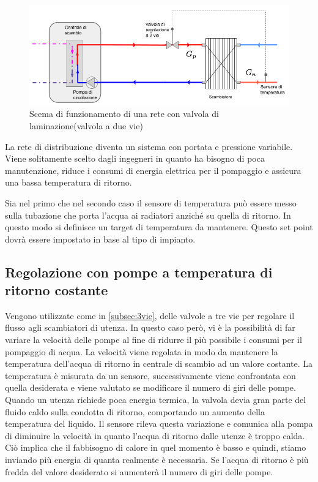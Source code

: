 \documentclass[laurea,oneside,11pt]{USiena_tesiLM}
\begin{document}
\begin{figure}[!ht]
\centering
\includegraphics[width=\textwidth]{figure/2vie}
\caption{Scema di funzionamento di una rete con valvola di laminazione(valvola a due vie)}
\label{fig:2vie}

\end{figure}

La rete di distribuzione diventa un sistema con portata e pressione variabile. Viene solitamente scelto dagli ingegneri in quanto ha bisogno di poca manutenzione, riduce i consumi di energia elettrica per il pompaggio e assicura una bassa temperatura di ritorno.

Sia nel primo che nel secondo caso il sensore di temperatura può essere messo sulla tubazione che porta l'acqua ai radiatori anziché su quella di ritorno. In questo modo si definisce un target di temperatura da mantenere. Questo set point dovrà essere impostato in base al tipo di impianto.

\subsection{Regolazione con pompe a temperatura di ritorno costante}
Vengono utilizzate come in \ref{subsec:3vie}, delle valvole a tre vie per regolare il flusso agli scambiatori di utenza. In questo caso però, vi è la possibilità di far variare la velocità delle pompe al fine di ridurre il più possibile i consumi per il pompaggio di acqua.
La velocità viene regolata in modo da mantenere la temperatura dell'acqua di ritorno in centrale di scambio ad un valore costante. La temperatura è misurata da un sensore, successivamente viene confrontata con quella desiderata e viene valutato se modificare il numero di giri delle pompe. 
Quando un utenza richiede poca energia termica, la valvola devia gran parte del fluido caldo sulla condotta di ritorno, comportando un aumento della temperatura del liquido. Il sensore rileva questa variazione e comunica alla pompa di diminuire la velocità in quanto l'acqua di ritorno dalle utenze è troppo calda. Ciò implica che il fabbisogno di calore in quel momento è basso e quindi, stiamo inviando più energia di quanta realmente è necessaria. Se l'acqua di ritorno è più fredda del valore desiderato si aumenterà il numero di giri delle pompe. 
\end{document}
